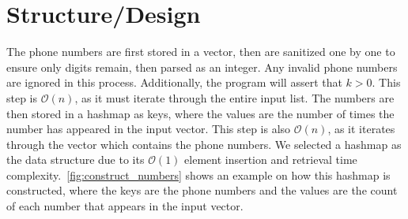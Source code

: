 \documentclass{report}
\begin{document}
\section{Structure/Design}
The phone numbers are first stored in a vector, then are sanitized one by one to ensure only digits remain, then parsed as an integer. Any invalid phone numbers are ignored in this process. Additionally, the program will assert that \(k > 0\). This step is \(\mathcal{O}(n)\), as it must iterate through the entire input list. The numbers are then stored in a hashmap as keys, where the values are the number of times the number has appeared in the input vector. This step is also \(\mathcal{O}(n)\), as it iterates through the vector which contains the phone numbers. We selected a hashmap as the data structure due to its \(\mathcal{O}(1)\) element insertion and retrieval time complexity.~\autoref{fig:construct_numbers} shows an example on how this hashmap is constructed, where the keys are the phone numbers and the values are the count of each number that appears in the input vector.
\end{document}
